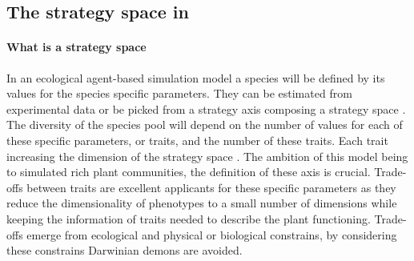 \subsection{The strategy space in \model}

\paragraph{What is a strategy space}
In an ecological agent-based simulation model a species will be defined by its values for the species specific parameters. They can be estimated from experimental data \cite{taubert_modelling_2014, maire_traits_2009,lohier_explaining_2014} or be picked from a strategy axis \cite{reineking_environmental_2006, kleidon_global_2000} composing a strategy space \cite{westoby_leaf-height-seed_1998}. The diversity of the species pool will depend on the number of values for each of these specific parameters, or traits, and the number of these traits. Each trait increasing the dimension of the strategy space \cite{laughlin_intrinsic_2014}. The ambition of this model being to simulated rich plant communities, the definition of these axis is crucial. Trade-offs between traits are excellent applicants for these specific parameters as they reduce the dimensionality of phenotypes to a small number of dimensions \cite{wright_worldwide_2004, diaz_global_2016, reich_world-wide_2014} while keeping the information of traits needed to describe the plant functioning. Trade-offs emerge from ecological and physical or biological constrains, by considering these constrains Darwinian demons are avoided.\\


